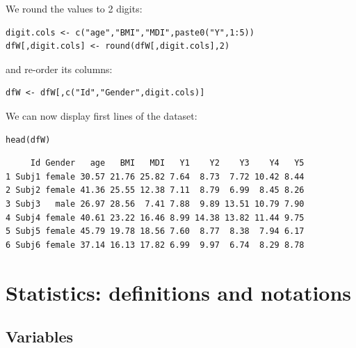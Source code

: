 \documentclass[12pt]{article}
\begin{document}
We round the values to 2 digits:
\lstset{language=r,label= ,caption= ,captionpos=b,numbers=none}
\begin{lstlisting}
digit.cols <- c("age","BMI","MDI",paste0("Y",1:5))
dfW[,digit.cols] <- round(dfW[,digit.cols],2)
\end{lstlisting}

and re-order its columns:
\lstset{language=r,label= ,caption= ,captionpos=b,numbers=none}
\begin{lstlisting}
dfW <- dfW[,c("Id","Gender",digit.cols)]
\end{lstlisting}

\clearpage

We can now display first lines of the dataset:
\lstset{language=r,label= ,caption= ,captionpos=b,numbers=none}
\begin{lstlisting}
head(dfW)
\end{lstlisting}
\begin{verbatim}
     Id Gender   age   BMI   MDI   Y1    Y2    Y3    Y4   Y5
1 Subj1 female 30.57 21.76 25.82 7.64  8.73  7.72 10.42 8.44
2 Subj2 female 41.36 25.55 12.38 7.11  8.79  6.99  8.45 8.26
3 Subj3   male 26.97 28.56  7.41 7.88  9.89 13.51 10.79 7.90
4 Subj4 female 40.61 23.22 16.46 8.99 14.38 13.82 11.44 9.75
5 Subj5 female 45.79 19.78 18.56 7.60  8.77  8.38  7.94 6.17
6 Subj6 female 37.14 16.13 17.82 6.99  9.97  6.74  8.29 8.78
\end{verbatim}

\clearpage

\section{Statistics: definitions and notations}
\label{sec:statistics}
\subsection{Variables}
\label{sec:org97c2cc5}
\end{document}

